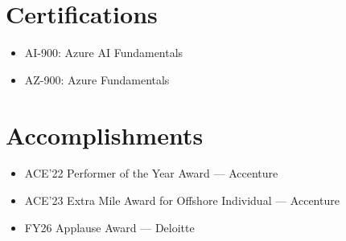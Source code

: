 \documentclass[letterpaper,11pt]{article}
\newcommand{\resumeItem}[1]{\item\small{{#1 \vspace{-2pt}}}}
\newcommand{\resumeItemListStart}{\begin{itemize}}
\newcommand{\resumeItemListEnd}{\end{itemize}\vspace{-5pt}}
\begin{document}
\section{Certifications}
 \resumeItemListStart
  \resumeItem{AI-900: Azure AI Fundamentals}
  \resumeItem{AZ-900: Azure Fundamentals}
 \resumeItemListEnd

\section{Accomplishments}
 \resumeItemListStart
  \resumeItem{ACE'22 Performer of the Year Award --- Accenture}
  \resumeItem{ACE'23 Extra Mile Award for Offshore Individual --- Accenture}
  \resumeItem{FY26 Applause Award --- Deloitte}
\resumeItemListEnd
\end{document}
